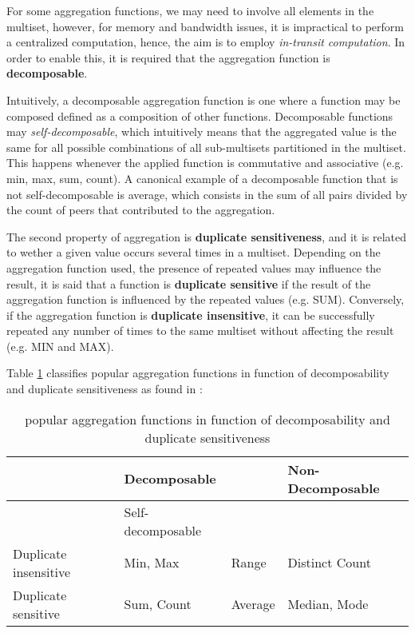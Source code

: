 For some aggregation functions, we may need to involve all elements in the multiset, however, for memory and bandwidth issues, it is impractical to perform a centralized computation, hence, the aim is to employ \textit{in-transit computation}. In order to enable this, it is required that the aggregation function is \textbf{decomposable}. 

Intuitively, a decomposable aggregation function is one where a function may be composed defined as a composition of other functions. Decomposable functions may \textit{self-decomposable}, which intuitively means that the aggregated value is the same for all possible combinations of all sub-multisets partitioned in the multiset. This happens whenever the applied function is commutative and associative (e.g. min, max, sum, count). A canonical example of a decomposable function that is not self-decomposable is average, which consists in the sum of all pairs divided by the count of peers that contributed to the aggregation.

The second property of aggregation is \textbf{duplicate sensitiveness}, and it is related to wether a given value occurs several times in a multiset. Depending on the aggregation function used, the presence of repeated values may influence the result, it is said that a function is \textbf{duplicate sensitive} if the result of the aggregation function is influenced by the repeated values (e.g. SUM). Conversely, if the aggregation function is \textbf{duplicate insensitive}, it can be successfully repeated any number of times to the same multiset without affecting the result (e.g. MIN and MAX).

Table \ref{table:aggregation_functions} classifies popular aggregation functions in function of decomposability and duplicate sensitiveness as found in \cite{DBLP:journals/corr/abs-1110-0725}:

\begin{table}[]
    \begin{tabular}{|l|l|l|l|}
    \hline
                          & \multicolumn{2}{l|}{Decomposable} & Non-Decomposable  \\ \hline
                          & Self-decomposable    &                             &  \\ \hline
    Duplicate insensitive & Min, Max             & Range     & Distinct Count    \\ \hline
    Duplicate sensitive   & Sum, Count           & Average   & Median, Mode     \\ \hline
    \end{tabular}
    \caption{popular aggregation functions in function of decomposability and duplicate sensitiveness}
    \label{table:aggregation_functions}
\end{table}


